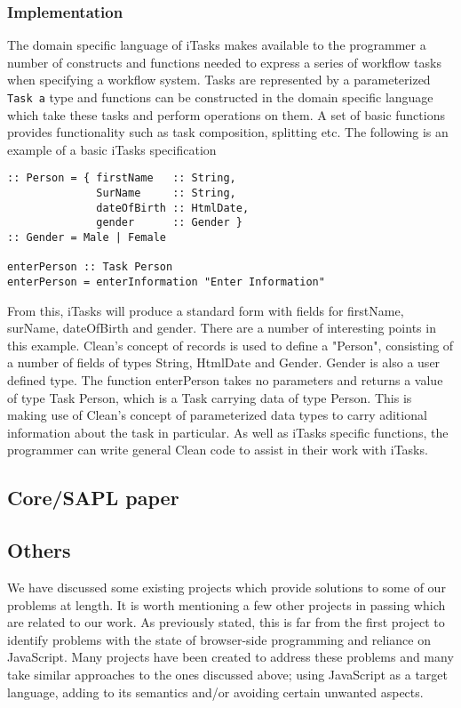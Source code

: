 \subsubsection{Implementation}
The domain specific language of iTasks makes available to the programmer a
number of constructs and functions needed to express a series of workflow
tasks when specifying a workflow system. Tasks are represented by a 
parameterized \verb!Task a!
type and functions can be constructed in the domain specific language which
take these tasks and perform operations on them. A set of basic functions
provides functionality such as task composition, splitting etc. The following
is an example of a basic iTasks specification

\begin{verbatim}
:: Person = { firstName   :: String, 
              SurName     :: String,
              dateOfBirth :: HtmlDate,
              gender      :: Gender }
:: Gender = Male | Female

enterPerson :: Task Person
enterPerson = enterInformation "Enter Information"
\end{verbatim}

From this, iTasks will produce a standard form with fields for firstName, 
surName, dateOfBirth and gender. There are a number of interesting points
in this example. Clean's concept of records is used to define a "Person",
consisting of a number of fields of types String, HtmlDate and Gender. 
Gender is also a user defined type. The function enterPerson takes no
parameters and returns a value of type Task Person, which is a Task
carrying data of type Person. This is making use of Clean's concept 
of parameterized data types to carry aditional information about the 
task in particular. As well as iTasks specific functions, the programmer
can write general Clean code to assist in their work with iTasks.

\subsection{Core/SAPL paper} 


\subsection{Others}
We have discussed some existing projects which provide solutions to 
some of our problems at length. It is worth mentioning a few other 
projects in passing which are related to our work. As previously stated,
this is far from the first project to identify problems with the state
of browser-side programming and reliance on JavaScript. Many projects
have been created to address these problems and many take similar 
approaches to the ones discussed above; using JavaScript as a target
language, adding to its semantics and/or avoiding certain unwanted 
aspects.

